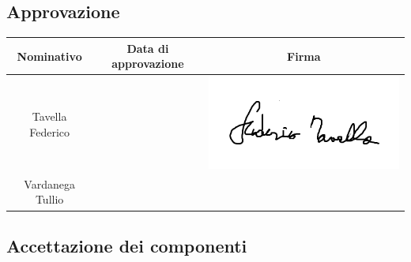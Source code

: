 \documentclass[PianoProgetto.tex]{subfiles}
\begin{document}
\begin{appendices}
\begin{table}[h]
	\end{table}
	

	
	\subsection{Approvazione}
	
		\begin{table}[h]

	
		\begin{tabularx}{\textwidth}{C C C}
			\toprule
			\textbf{Nominativo} & \textbf{Data di approvazione} & \textbf{Firma} \\
			\midrule
			Tavella Federico &  & \includegraphics[scale=0.3, trim=0 2cm 0 0.3cm]{firme_componenti/ftavella_firma} \\[1ex]
			\midrule
			Vardanega Tullio &  &  \\[1ex]
			\bottomrule
		\end{tabularx}
		
	\end{table}		
\newpage	
	\subsection{Accettazione dei componenti}
	
		\begin{table}[h]
	

\end{table}
\end{appendices}
\end{document}

